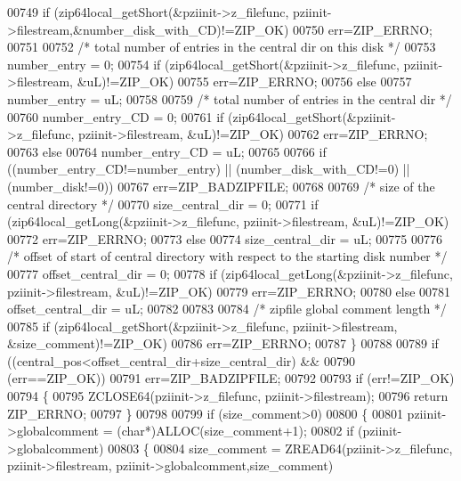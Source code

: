 \begin{DoxyCode}
00749     \textcolor{keywordflow}{if} (zip64local\_getShort(&pziinit->z\_filefunc, pziinit->filestream,&number\_disk\_with\_CD)!=ZIP\_OK)
00750       err=ZIP\_ERRNO;
00751 
00752     \textcolor{comment}{/* total number of entries in the central dir on this disk */}
00753     number\_entry = 0;
00754     \textcolor{keywordflow}{if} (zip64local\_getShort(&pziinit->z\_filefunc, pziinit->filestream, &uL)!=ZIP\_OK)
00755       err=ZIP\_ERRNO;
00756     \textcolor{keywordflow}{else}
00757       number\_entry = uL;
00758 
00759     \textcolor{comment}{/* total number of entries in the central dir */}
00760     number\_entry\_CD = 0;
00761     \textcolor{keywordflow}{if} (zip64local\_getShort(&pziinit->z\_filefunc, pziinit->filestream, &uL)!=ZIP\_OK)
00762       err=ZIP\_ERRNO;
00763     \textcolor{keywordflow}{else}
00764       number\_entry\_CD = uL;
00765 
00766     \textcolor{keywordflow}{if} ((number\_entry\_CD!=number\_entry) || (number\_disk\_with\_CD!=0) || (number\_disk!=0))
00767       err=ZIP\_BADZIPFILE;
00768 
00769     \textcolor{comment}{/* size of the central directory */}
00770     size\_central\_dir = 0;
00771     \textcolor{keywordflow}{if} (zip64local\_getLong(&pziinit->z\_filefunc, pziinit->filestream, &uL)!=ZIP\_OK)
00772       err=ZIP\_ERRNO;
00773     \textcolor{keywordflow}{else}
00774       size\_central\_dir = uL;
00775 
00776     \textcolor{comment}{/* offset of start of central directory with respect to the starting disk number */}
00777     offset\_central\_dir = 0;
00778     \textcolor{keywordflow}{if} (zip64local\_getLong(&pziinit->z\_filefunc, pziinit->filestream, &uL)!=ZIP\_OK)
00779       err=ZIP\_ERRNO;
00780     \textcolor{keywordflow}{else}
00781       offset\_central\_dir = uL;
00782 
00783 
00784     \textcolor{comment}{/* zipfile global comment length */}
00785     \textcolor{keywordflow}{if} (zip64local\_getShort(&pziinit->z\_filefunc, pziinit->filestream, &size\_comment)!=ZIP\_OK)
00786       err=ZIP\_ERRNO;
00787   \}
00788 
00789   \textcolor{keywordflow}{if} ((central\_pos<offset\_central\_dir+size\_central\_dir) &&
00790     (err==ZIP\_OK))
00791     err=ZIP\_BADZIPFILE;
00792 
00793   \textcolor{keywordflow}{if} (err!=ZIP\_OK)
00794   \{
00795     ZCLOSE64(pziinit->z\_filefunc, pziinit->filestream);
00796     \textcolor{keywordflow}{return} ZIP\_ERRNO;
00797   \}
00798 
00799   \textcolor{keywordflow}{if} (size\_comment>0)
00800   \{
00801     pziinit->globalcomment = (\textcolor{keywordtype}{char}*)ALLOC(size\_comment+1);
00802     \textcolor{keywordflow}{if} (pziinit->globalcomment)
00803     \{
00804       size\_comment = ZREAD64(pziinit->z\_filefunc, pziinit->filestream, pziinit->globalcomment,size\_comment)

\end{DoxyCode}
